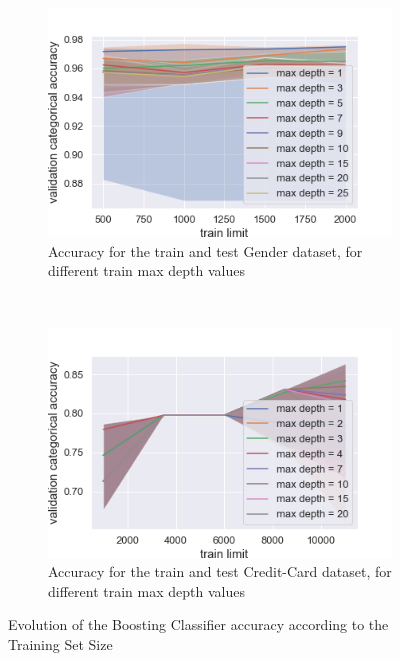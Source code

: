\documentclass[10pt]{article}
\begin{document}
		\paragraph*{}
			\begin{figure}[h]
				\centering
				\begin{subfigure}[]{0.45\columnwidth}
					\centering
					\includegraphics[width=\linewidth]{../graphics/boost_gender_train_limit_score_type_max_depth.png}
					\caption{Accuracy for the train and test Gender dataset, for different train max depth values}
					\label{boost:g_train_limit}
				\end{subfigure}
				~
				\begin{subfigure}[]{0.45\columnwidth}
					\centering
					\includegraphics[width=\linewidth]{../graphics/boost_creditcard_train_limit_score_type_max_depth.png}
					\caption{Accuracy for the train and test Credit-Card dataset, for different train max depth values}
					\label{boost:cc_train_limit}
				\end{subfigure}
				\caption{Evolution of the Boosting Classifier accuracy according to the Training Set Size}
				\label{boost:train_limit}
			\end{figure}
\end{document}
